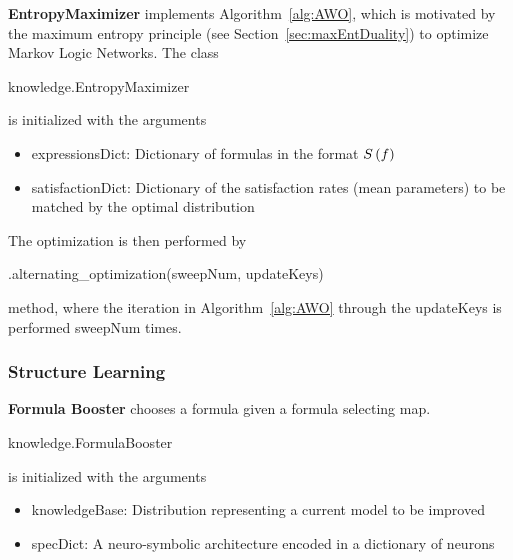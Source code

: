 \textbf{EntropyMaximizer} implements Algorithm~\ref{alg:AWO}, which is motivated by the maximum entropy principle (see Section~\ref{sec:maxEntDuality}) to optimize Markov Logic Networks.
The class  
\begin{centeredcode}
	knowledge.EntropyMaximizer
\end{centeredcode}
is initialized with the arguments
\begin{itemize}
	\item expressionsDict: Dictionary of formulas in the format $S\left(f\right)$ 
	\item satisfactionDict: Dictionary of the satisfaction rates (mean parameters) to be matched by the optimal distribution
\end{itemize}
The optimization is then performed by
\begin{centeredcode}
	.alternating\_optimization(sweepNum, updateKeys)
\end{centeredcode}
method, where the iteration in Algorithm~\ref{alg:AWO} through the updateKeys is performed sweepNum times.

\subsubsection{Structure Learning}

\textbf{Formula Booster} chooses a formula given a formula selecting map.
\begin{centeredcode}
	knowledge.FormulaBooster
\end{centeredcode}
is initialized with the arguments
\begin{itemize}
	\item knowledgeBase: Distribution representing a current model to be improved
	\item specDict: A neuro-symbolic architecture encoded in a dictionary of neurons
\end{itemize}


